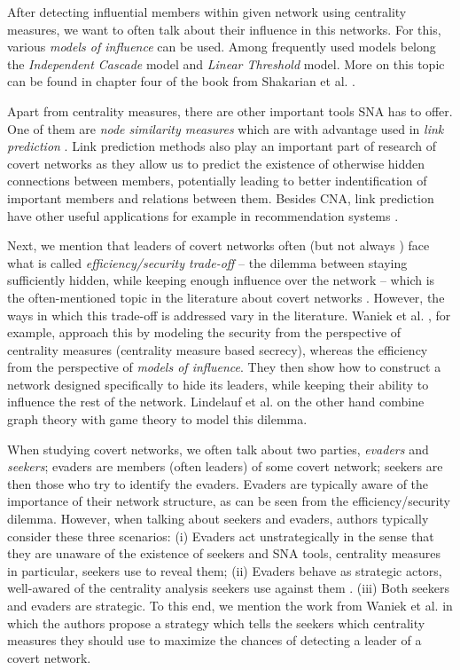 After detecting influential members within given network using centrality measures,
we want to often talk about their influence in this networks.
For this, various \emph{models of influence} can be used.
Among frequently used models belong the \emph{Independent Cascade} model and \emph{Linear Threshold} model.
More on this topic can be found in chapter four of the book from Shakarian et al. \cite{Shakarian2015}.

Apart from centrality measures, there are other important tools SNA has to offer.
One of them are \emph{node similarity measures} which are with advantage used in \emph{link prediction} \cite{Zhou2009,Wang2014}.
Link prediction methods also play an important part of research of covert networks
as they allow us to predict the existence of otherwise hidden connections between members, potentially leading to
better indentification of important members and relations between them.
Besides CNA, link prediction have other useful applications for example in recommendation systems \cite{Huang2005,Talasu2017}.

Next, we mention that leaders of covert networks often (but not always \cite{Fatih2012}) face what is called
\emph{efficiency/security trade-off} \cite{Morselli2007} --
the dilemma between staying sufficiently hidden, while keeping enough influence over the network --
which is the often-mentioned topic in the literature about covert networks \cite{Crossley2012,Waniek2017,Lindelauf2009}.
However, the ways in which this trade-off is addressed vary in the literature.
Waniek et al. \cite{Waniek2017}, for example, approach this by modeling the security from the perspective of
centrality measures (centrality measure based secrecy), whereas the efficiency from the perspective of \emph{models of influence}.
They then show how to construct a network designed specifically to hide its leaders, while
keeping their ability to influence the rest of the network.
Lindelauf et al. \cite{Lindelauf2009} on the other hand combine graph theory with game theory to model this dilemma.

When studying covert networks, we often talk about two parties, \emph{evaders} and \emph{seekers};
evaders are members (often leaders) of some covert network;
seekers are then those who try to identify the evaders.
Evaders are typically aware of the importance of their network structure, as can be seen from
the efficiency/security dilemma.
However, when talking about seekers and evaders, authors typically consider these three scenarios:
(i) Evaders act unstrategically in the sense that they are unaware of
the existence of seekers and SNA tools, centrality measures in particular, seekers use to reveal them;
(ii) Evaders behave as strategic actors, well-awared of the centrality analysis seekers use against them \cite{Waniek2017,Dey2019,Dey2020}.
(iii) Both seekers and evaders are strategic.
To this end, we mention the work from Waniek et al. \cite[y.~2021]{Waniek2021} in which the authors propose
a strategy which tells the seekers which centrality measures they should use to maximize the chances of detecting
a leader of a covert network.


